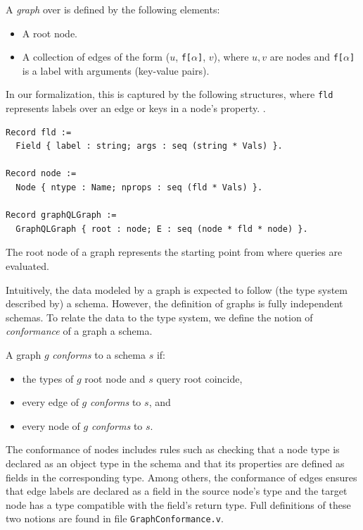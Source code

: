 \begin{definition}
A \emph{\gql graph} over \Vals{} is defined by the following elements:
\begin{itemize}
    \item A root node.
    \item A collection of edges of the form ($u$, \texttt{f[}$\alpha$\texttt{]}, $v$), where $u, v$ are nodes and \texttt{f[}$\alpha$\texttt{]} is a label with arguments (key-value pairs).
\end{itemize}
\end{definition}

In our formalization, this is captured by the following structures, where \texttt{fld} represents labels over an edge or keys in a node's property. . 
%
\begin{verbatim}
Record fld := 
  Field { label : string; args : seq (string * Vals) }.

Record node := 
  Node { ntype : Name; nprops : seq (fld * Vals) }.

Record graphQLGraph := 
  GraphQLGraph { root : node; E : seq (node * fld * node) }.
\end{verbatim}
%
 The root node of a \gql graph represents the starting point from where queries are evaluated.

Intuitively, the data modeled by a \gql graph is expected to follow (the type system described by) a schema. However, the definition of graphs is fully independent schemas. To relate the data to the type system, we define the notion of \textit{conformance} of a graph \wrt a schema.
%
\begin{definition}
A \gql graph $g$ \textit{conforms} to a schema $s$ if:
\begin{itemize}
    \item the types of $g$ root node and $s$ query root coincide, 
    \item every edge of $g$ \textit{conforms} to $s$, and
    \item every node of $g$ \textit{conforms} to $s$.
\end{itemize}
\end{definition}
%
The conformance of nodes includes rules such as checking that a node type is declared as an object type in the schema and that its properties are defined as fields in the corresponding type. Among others, the conformance of edges ensures that edge labels are declared as a field in the source node's type and the target node has a type compatible with the field's return type. Full definitions of these two notions are found in file \texttt{GraphConformance.v}.

